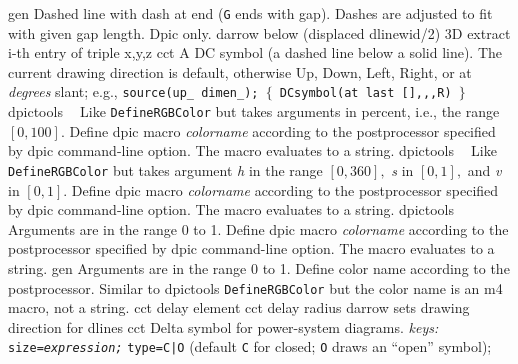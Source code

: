   {gen}%
  {Dashed line with dash at end ({\tt G} ends with gap). Dashes are
   adjusted to fit with given gap length. Dpic only.}%
%
  {darrow}%
  {below (displaced dlinewid/2)}%
%
  {3D}%
  {extract i-th entry of triple x,y,z}%
%
  {cct}%
  {A DC symbol (a dashed line below a solid line).
   The current drawing direction is default, otherwise Up, Down,
   Left, Right, or at {\sl degrees} slant; e.g., 
   {\tt source(up\_ dimen\_); $\lbrace$ DCsymbol(at last [],{},{},R) $\rbrace$}
    }%
%
  {dpictools}%
  {$\;\;$ Like {\tt DefineRGBColor} but takes arguments in percent, i.e.,
    the range $[0,100].$ Define dpic macro {\sl colorname}
    according to the postprocessor specified by dpic command-line option.
    The macro evaluates to a string.}%
%
  {dpictools}%
  {$\;\;$ Like {\tt DefineRGBColor} but takes argument {\sl h} in the
    range $[0,360],$ {\sl s} in $[0,1],$ and {\sl v} in $[0,1].$
    Define dpic macro {\sl colorname}
    according to the postprocessor specified by dpic command-line option.
    The macro evaluates to a string.}%
%
  {dpictools}%
  {$\;\;$ Arguments are in the range 0 to 1. Define dpic macro {\sl colorname}
    according to the postprocessor specified by dpic command-line option.
    The macro evaluates to a string.}%
%
  {gen}%
  {Arguments are in the range 0 to 1. Define color name
    according to the postprocessor.  Similar to dpictools {\tt DefineRGBColor}
    but the color name is an m4 macro, not a string.}%
%
  {cct}%
  {delay element}%
%
  {cct}%
  {delay radius}%
%
  {darrow}%
  {sets drawing direction for dlines}%
%
  {cct}%
  {Delta symbol for power-system diagrams.
   {\sl keys:} {\tt size={\sl expression;}}
    {\tt type=C|O} (default {\tt C} for closed;
      {\tt O} draws an ``open'' symbol); }%
%
